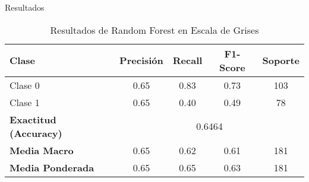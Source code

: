 \documentclass[11pt]{article}
\begin{document}
\begin{section}{Resultados}
\begin{table}[htbp]
\centering
\caption{Resultados de Random Forest en Escala de Grises}
\begin{tabular}{|l|c|c|c|c|}
\hline
\textbf{Clase} & \textbf{Precisión} & \textbf{Recall} & \textbf{F1-Score} & \textbf{Soporte} \\
\hline
Clase 0 & 0.65 & 0.83 & 0.73 & 103 \\
Clase 1 & 0.65 & 0.40 & 0.49 & 78 \\
\hline
\textbf{Exactitud (Accuracy)} & \multicolumn{4}{c|}{0.6464} \\
\textbf{Media Macro} & 0.65 & 0.62 & 0.61 & 181 \\
\textbf{Media Ponderada} & 0.65 & 0.65 & 0.63 & 181 \\
\hline
\end{tabular}
\end{table}


\end{section}
\end{document}
